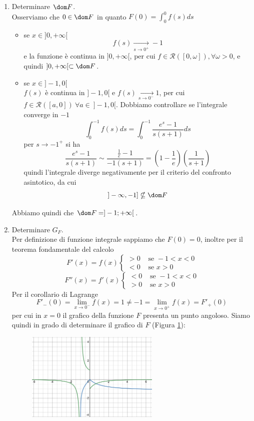 \documentclass{article}
\newcommand{\se}{\text{ se }}
\begin{document}
\begin{enumerate}[label=\textbf{Esercizio 12.\arabic*.},itemindent=*]
\begin{enumerate}
    \item Determinare $\dom F$.\\    
    Osserviamo che $0\in \dom F$ in quanto $F(0)=\int_0^0f(s)ds$
    \begin{itemize}
        \item se $x \in ]0,+\infty[$
        \[f(s)\underset{s\to0^+}{\longrightarrow}- 1\]
        e la funzione è continua in $]0,+\infty[$, per cui $f\in \mathcal{R}([0,\omega]), \forall \omega >0$, e quindi $]0,+\infty[\subset \dom F$.
        \item se $x\in]-1,0[$\\
        $f(s)$ è continua in $]-1,0[$ e $f(s)\underset{s\to0^-}{\longrightarrow}1$, per cui $f\in \mathcal{R}([a,0])~\forall a\in ~]-1,0[$.
        Dobbiamo controllare se l'integrale converge in $-1$
        \[\int_0^{-1}f(s)ds=\int_0^{-1}\frac{e^s-1}{s(s+1)}ds\]
        per $s\to-1^+$ si ha 
        \[\frac{e^s-1}{s(s+1)}\sim \frac{\frac{1}{e}-1}{-1(s+1)}=\left( 1-\frac{1}{e} \right)\left( \frac{1}{s+1} \right)\]
        quindi l'integrale diverge negativamente per il criterio del confronto asintotico, da cui
        \[]-\infty,-1]\nsubseteq\dom F\]
    \end{itemize}
    Abbiamo quindi che $\dom F=]-1;+\infty[$.
    \item Determinare $G_F$.\\
    Per definizione di funzione integrale sappiamo che $F(0)=0$, inoltre per il teorema fondamentale del calcolo
    \[F'(x)=f(x)\begin{cases}
        >0&\se -1<x<0\\
        <0&\se x>0
    \end{cases}\]
    \[F''(x)=f'(x)\begin{cases}
        <0&\se -1<x<0\\
        >0&\se x>0
    \end{cases}\]
    Per il corollario di Lagrange
    \[F'_-(0)=\lim_{x\to0^-}f(x)=1\neq -1=\lim_{x\to0^+}f(x)=F'_+(0)\]
    per cui in $x=0$ il grafico della funzione $F$ presenta un punto angoloso.
    Siamo quindi in grado di determinare il grafico di $F$ (Figura \ref{fig:1.2}):
    \begin{figure}[ht]
        \centering
        \includegraphics[width=0.6\textwidth]{src/disegno2.png}
        \caption{}
        \label{fig:1.2}
    \end{figure}
\end{enumerate}


\end{enumerate}
\end{document}
